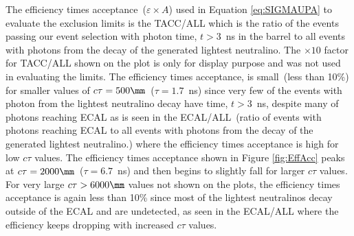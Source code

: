 \vspace{5mm}
The efficiency times acceptance~($\varepsilon \times A$) used in Equation \ref{eq:SIGMAUPA} to evaluate the exclusion limits is the TACC/ALL which is the ratio of the events passing our event selection with photon time, $t > 3$~ns in the barrel to all events with photons from the decay of the generated lightest neutralino. The $\times 10$  factor for TACC/ALL shown on the plot  is only for display purpose and was not used in evaluating the limits. 
\newline
The efficiency times acceptance, is small~(less than 10\%) for smaller values of $c\tau = 500\mm$~($\tau = 1.7$~ns) since very few of the events with photon from the lightest neutralino decay have time, $t > 3$~ns, despite many of photons reaching ECAL as is seen in the ECAL/ALL~(ratio of events with photons reaching ECAL to all events with photons from the decay of the generated lightest neutralino.) where the efficiency times acceptance is high for low $c\tau$ values. 
\newline
The efficiency times acceptance shown in Figure \ref{fig:EffAcc} peaks at $c\tau = 2000\mm$~($\tau = 6.7$~ns) and then begins to slightly fall for larger $c\tau$ values. For very large $c\tau > 6000\mm$ values not shown on the plots, the efficiency times acceptance is again less than 10\% since most of the lightest neutralinos decay outside of the ECAL and are undetected, as seen in the ECAL/ALL where the efficiency keeps dropping with increased $c\tau$ values.

